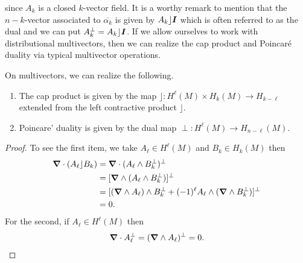 \documentclass{article}
\begin{document}
since $A_k$ is a closed $k$-vector field. It is a worthy remark to mention that the $n-k$-vector associated to $\overline{\alpha_k}$ is given by $A_k \rfloor \boldsymbol{I}$ which is often referred to as the dual and we can put $A_k^\perp = A_k \rfloor \boldsymbol{I}$. If we allow ourselves to work with distributional multivectors, then we can realize the cap product and Poincar\'e duality via typical multivector operations.
\begin{proposition}
On multivectors, we can realize the following.
\begin{enumerate}
    \item The cap product is given by the map $\rfloor \colon H^\ell(M)\times H_{k}(M) \to H_{k-\ell}$ extended from the left contractive product $\rfloor$.
    \item Poincare' duality is given by the dual map $\perp \colon H^\ell(M) \to H_{n-\ell}(M)$.
\end{enumerate}
\end{proposition}
\begin{proof}
To see the first item, we take $A_\ell\in H^\ell(M)$ and $B_k \in H_k(M)$ then
\begin{align}
    \boldsymbol{\nabla} \cdot (A_\ell \rfloor B_k) &= \boldsymbol{\nabla} \cdot (A_\ell \wedge B_k^\perp)^\perp\\
    &= [\boldsymbol{\nabla} \wedge (A_\ell \wedge B_k^\perp)]^\perp\\
    &= [(\boldsymbol{\nabla} \wedge A_\ell)\wedge B_k^\perp +(-1)^\ell A_\ell \wedge (\boldsymbol{\nabla} \wedge B_k^\perp)]^\perp\\
    &= 0.
\end{align}
For the second, if $A_{\ell}\in H^\ell(M)$ then
\begin{align}
    \boldsymbol{\nabla} \cdot A_\ell^\perp = (\boldsymbol{\nabla} \wedge A_\ell)^\perp = 0.
\end{align}
\end{proof}
\end{document}
